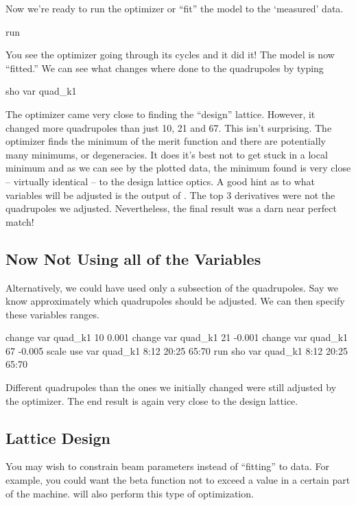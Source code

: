Now we're ready to run the optimizer or ``fit'' the model to the `measured' data.
\begin{example}
  run
\end{example}
You see the optimizer going through its cycles and it did it! The model is now
``fitted.'' We can see what changes where done to the quadrupoles by typing
\begin{example}
  sho var quad\_k1
\end{example}
The optimizer came very close to finding the ``design'' lattice. However, it
changed more quadrupoles than just 10, 21 and 67. This isn't surprising. The
optimizer finds the minimum of the merit function and there are potentially many
minimums, or degeneracies.  It does it's best not to get stuck in a local
minimum and as we can see by the plotted data, the minimum found is very close
-- virtually identical -- to the design lattice optics.  A good hint as to what
variables will be adjusted is the output of .  The top 3
derivatives were not the quadrupoles we adjusted. Nevertheless, the final result
was a darn near perfect match!

\subsection{Now Not Using all of the Variables}
\label{ss:fix_it_not_all}

Alternatively, we could have used only a subsection of the quadrupoles. Say we
know approximately which quadrupoles should be adjusted. We can then specify these
variables ranges.
\begin{example}
  change var quad\_k1 10 0.001
  change var quad\_k1 21 -0.001
  change var quad\_k1 67 -0.005
  scale
  use var quad\_k1 8:12 20:25 65:70
  run
  sho var quad\_k1 8:12 20:25 65:70
\end{example}
Different quadrupoles than the ones we initially changed were still adjusted
by the optimizer. The end result is again very close to the design lattice.

\subsection{Lattice Design}
\label{ss:lattice_design}

You may wish to constrain beam parameters instead of ``fitting'' to data. For
example, you could want the beta function not to exceed a value in a certain
part of the machine. \tao will also perform this type of optimization.

